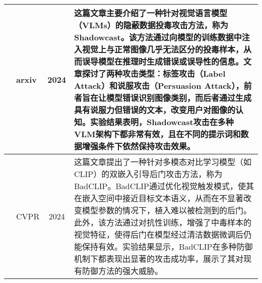 \documentclass[lettersize,journal]{IEEEtran}
\begin{document}
\begin{longtable}{|c|p{3cm}|c|p{12cm}|}
   \cite{xu2024shadowcast} & arxiv  & 2024 & 这篇文章主要介绍了一种针对视觉语言模型（VLMs）的隐蔽数据投毒攻击方法，称为Shadowcast。该方法通过向模型的训练数据中注入视觉上与正常图像几乎无法区分的投毒样本，从而误导模型在推理时生成错误或误导性的信息。文章探讨了两种攻击类型：标签攻击（Label Attack）和说服攻击（Persuasion Attack），前者旨在让模型错误识别图像类别，而后者通过生成具有说服力但错误的文本，改变用户对图像的认知。实验结果表明，Shadowcast攻击在多种VLM架构下都非常有效，且在不同的提示词和数据增强条件下依然保持攻击效果。\\ \hline
   \cite{liang2024badclip} & CVPR & 2024 & 这篇文章提出了一种针对多模态对比学习模型（如CLIP）的双嵌入引导后门攻击方法，称为BadCLIP。BadCLIP通过优化视觉触发模式，使其在嵌入空间中接近目标文本语义，从而在不显著改变模型参数的情况下，植入难以被检测到的后门。此外，该方法通过对抗性训练，增强了中毒样本的视觉特征，使得后门在模型经过清洁数据微调后仍能保持有效。实验结果显示，BadCLIP在多种防御机制下都表现出显著的攻击成功率，展示了其对现有防御方法的强大威胁。\\ \hline


\end{longtable}
\end{document}
